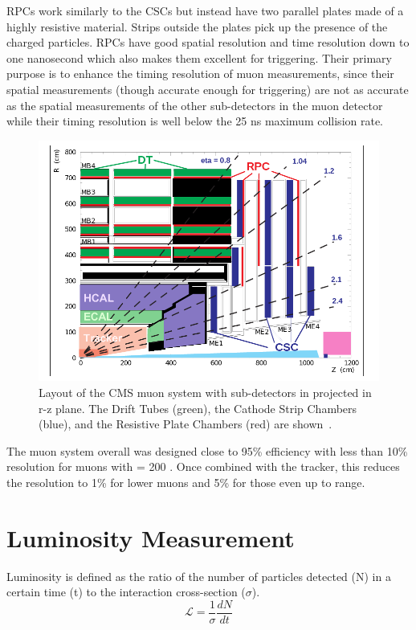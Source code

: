	RPCs work similarly to the CSCs but instead have two parallel plates made of a highly resistive material. Strips outside the plates pick up the presence of the charged particles. RPCs have good spatial resolution and time resolution down to one nanosecond which also makes them excellent for triggering. Their primary purpose is to enhance the timing resolution of muon measurements, since their spatial measurements (though accurate enough for triggering) are not as accurate as the spatial measurements of the other sub-detectors in the muon detector while their timing resolution is well below the 25 ns maximum collision rate.\\
						\begin{figure}[h]
\begin{center}
\includegraphics[width=0.8\linewidth]{Figs/muon_system.png}
\caption{\label{fig:muonchamber}
Layout of the CMS muon system with sub-detectors in projected in r-z plane. The Drift Tubes (green), the Cathode Strip Chambers (blue), and the Resistive Plate Chambers (red) are shown~\cite{muontdr}.
}
\end{center}
\end{figure}
	
		The muon system overall was designed close to 95\% efficiency with less than 10\% resolution for muons with \pt = 200 \GeV. Once combined with the tracker, this reduces the resolution to 1\% for lower \pt muons and 5\% for those even up to \TeV range.\\
		
		
		
	
	\section{Luminosity Measurement}	
		Luminosity is defined as the ratio of the number of particles detected (N) in a certain time (t) to the interaction cross-section ($\sigma$). 
		\begin{equation}
		\mathcal{L} = \frac{1}{\sigma} \frac{dN}{dt}
		\end{equation}
		
